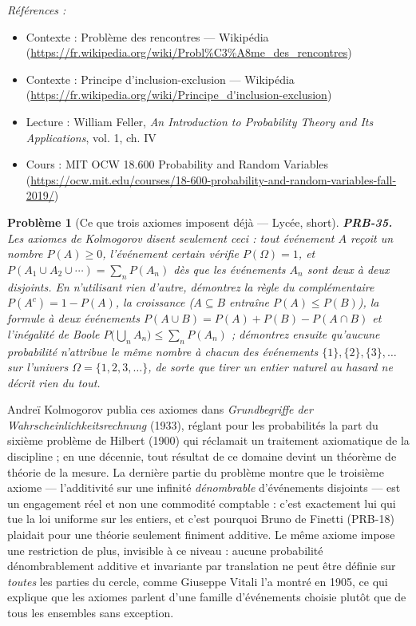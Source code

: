 \documentclass[11pt]{article}
\newtheorem{problem}{Problème}
\newenvironment{refs}{\par\small\noindent\emph{Références :}\begin{itemize}\setlength\itemsep{0pt}}{\end{itemize}\normalsize}
\begin{document}
\begin{refs}
\item Contexte : Problème des rencontres --- Wikipédia (\url{https://fr.wikipedia.org/wiki/Probl%C3%A8me_des_rencontres})
\item Contexte : Principe d'inclusion-exclusion --- Wikipédia (\url{https://fr.wikipedia.org/wiki/Principe_d'inclusion-exclusion})
\item Lecture : William Feller, \textit{An Introduction to Probability Theory and Its Applications}, vol. 1, ch. IV
\item Cours : MIT OCW 18.600 Probability and Random Variables (\url{https://ocw.mit.edu/courses/18-600-probability-and-random-variables-fall-2019/})
\end{refs}

\bigskip

\begin{problem}[{Ce que trois axiomes imposent déjà --- Lycée, short}]
\textbf{PRB-35.} Les axiomes de Kolmogorov disent seulement ceci : tout
événement $ A $ reçoit un nombre $ P(A) \ge 0 $, l'événement certain vérifie
$ P(\Omega) = 1 $, et $ P(A_1 \cup A_2 \cup \cdots) = \sum_{n} P(A_n) $ dès que les événements
$ A_n $ sont deux à deux disjoints. En n'utilisant rien d'autre, démontrez la règle du
complémentaire $ P(A^c) = 1 - P(A) $, la croissance ($ A \subseteq B $ entraîne
$ P(A) \le P(B) $), la formule à deux événements
$ P(A \cup B) = P(A) + P(B) - P(A \cap B) $ et l'inégalité de Boole
$ P\big( \bigcup_n A_n \big) \le \sum_n P(A_n) $ ; démontrez ensuite qu'aucune probabilité
n'attribue le \textit{même} nombre à chacun des événements $ \{1\}, \{2\}, \{3\}, \dots $ sur
l'univers $ \Omega = \{1,2,3,\dots\} $, de sorte que \og{} tirer un entier naturel au hasard \fg{} ne
décrit rien du tout.
\end{problem}

\noindent Andreï Kolmogorov publia ces axiomes dans \textit{Grundbegriffe der
Wahrscheinlichkeitsrechnung} (1933), réglant pour les probabilités la part du sixième problème
de Hilbert (1900) qui réclamait un traitement axiomatique de la discipline ; en une décennie, tout
résultat de ce domaine devint un théorème de théorie de la mesure. La dernière partie du problème
montre que le troisième axiome --- l'additivité sur une infinité \textit{dénombrable} d'événements
disjoints --- est un engagement réel et non une commodité comptable : c'est exactement lui qui tue
la loi uniforme sur les entiers, et c'est pourquoi Bruno de Finetti (PRB-18) plaidait pour une
théorie seulement finiment additive. Le même axiome impose une restriction de plus, invisible à ce
niveau : aucune probabilité dénombrablement additive et invariante par translation ne peut être
définie sur \textit{toutes} les parties du cercle, comme Giuseppe Vitali l'a montré en 1905, ce qui
explique que les axiomes parlent d'une famille d'événements choisie plutôt que de tous les
ensembles sans exception.
\end{document}
